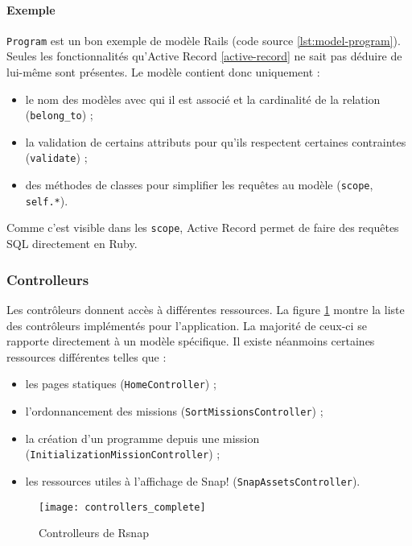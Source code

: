 \paragraph{Exemple} \texttt{Program} est un bon exemple de modèle Rails (code source \ref{lst:model-program}). Seules les fonctionnalités qu’Active Record \ref{active-record} ne sait pas déduire de lui-même sont présentes. Le modèle contient donc uniquement :
\begin{itemize}
  \item le nom des modèles avec qui il est associé et la cardinalité de la relation (\texttt{belong\_to}) ;
  \item la validation de certains attributs pour qu'ils respectent certaines contraintes (\texttt{validate}) ;
  \item des méthodes de classes pour simplifier les requêtes au modèle (\texttt{scope}, \texttt{self.*}).
\end{itemize}

Comme c'est visible dans les \texttt{scope}, Active Record permet de faire des requêtes SQL directement en Ruby. 


\subsubsection{Controlleurs}
Les contrôleurs donnent accès à différentes ressources. La figure \ref{fig:controllers} montre la liste des contrôleurs implémentés pour l'application. La majorité de ceux-ci se rapporte directement à un modèle spécifique. Il existe néanmoins certaines ressources différentes telles que : 
\begin{itemize}
  \item les pages statiques (\texttt{HomeController}) ;
  \item l'ordonnancement des missions (\texttt{SortMissionsController}) ; 
  \item la création d'un programme depuis une mission (\texttt{InitializationMissionController}) ;
  \item les ressources utiles à l'affichage de Snap! (\texttt{SnapAssetsController}).
\end{itemize}
\begin{figure}
 \begin{center}
   \texttt{[image: controllers\_complete]}
   \caption{Controlleurs de Rsnap}
   \label{fig:controllers}
 \end{center}
\end{figure}

